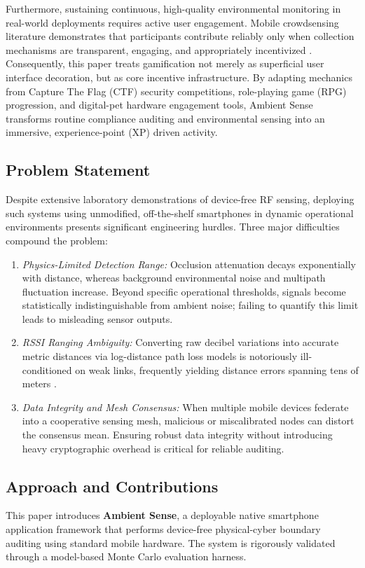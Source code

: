 \documentclass[journal,10pt]{IEEEtran}
\begin{document}
Furthermore, sustaining continuous, high-quality environmental monitoring in real-world deployments requires active user engagement. Mobile crowdsensing literature demonstrates that participants contribute reliably only when collection mechanisms are transparent, engaging, and appropriately incentivized \cite{zhang2022,wang2018}. Consequently, this paper treats gamification not merely as superficial user interface decoration, but as core incentive infrastructure. By adapting mechanics from Capture The Flag (CTF) security competitions, role-playing game (RPG) progression, and digital-pet hardware engagement tools, Ambient Sense transforms routine compliance auditing and environmental sensing into an immersive, experience-point (XP) driven activity.

\subsection{Problem Statement}
Despite extensive laboratory demonstrations of device-free RF sensing, deploying such systems using unmodified, off-the-shelf smartphones in dynamic operational environments presents significant engineering hurdles. Three major difficulties compound the problem:
\begin{enumerate}
    \item \emph{Physics-Limited Detection Range:} Occlusion attenuation decays exponentially with distance, whereas background environmental noise and multipath fluctuation increase. Beyond specific operational thresholds, signals become statistically indistinguishable from ambient noise; failing to quantify this limit leads to misleading sensor outputs.
    \item \emph{RSSI Ranging Ambiguity:} Converting raw decibel variations into accurate metric distances via log-distance path loss models is notoriously ill-conditioned on weak links, frequently yielding distance errors spanning tens of meters \cite{ramirez2021,milano2024}.
    \item \emph{Data Integrity and Mesh Consensus:} When multiple mobile devices federate into a cooperative sensing mesh, malicious or miscalibrated nodes can distort the consensus mean. Ensuring robust data integrity without introducing heavy cryptographic overhead is critical for reliable auditing.
\end{enumerate}

\subsection{Approach and Contributions}
This paper introduces \textbf{Ambient Sense}, a deployable native smartphone application framework that performs device-free physical-cyber boundary auditing using standard mobile hardware. The system is rigorously validated through a model-based Monte Carlo evaluation harness. 
\end{document}
